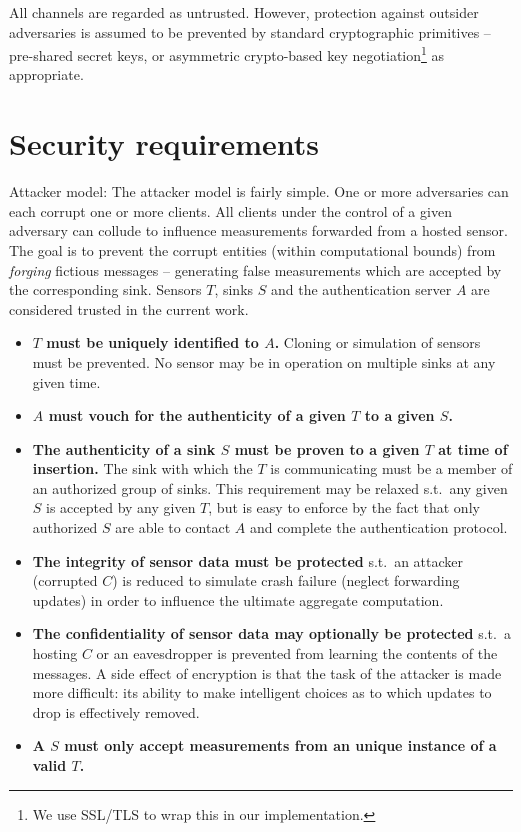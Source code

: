 \documentclass[10pt,a4paper]{article}
\begin{document}
All channels are regarded as untrusted. However, protection against outsider adversaries is assumed to be prevented by standard cryptographic primitives -- pre-shared secret keys, or asymmetric crypto-based key negotiation\footnote{We use SSL/TLS to wrap this in our implementation.} as appropriate.


\section{Security requirements}

Attacker model: The attacker model is fairly simple. One or more adversaries can each corrupt one or more clients. All clients under the control of a given adversary can collude to influence measurements forwarded from a hosted sensor. The goal is to prevent the corrupt entities (within computational bounds) from \textit{forging} fictious messages -- generating false measurements which are accepted by the corresponding sink.
Sensors $T$, sinks $S$ and the authentication server $A$ are considered trusted in the current work.

\begin{itemize}
\item \textbf{$T$ must be uniquely identified to $A$.} Cloning or simulation of sensors must be prevented. No sensor may be in operation on multiple sinks at any given time.
\item \textbf{$A$ must vouch for the authenticity of a given $T$ to a given $S$.} 
\item \textbf{The authenticity of a sink $S$ must be proven to a given $T$ at time of insertion.} The sink with which the $T$ is communicating must be a member of an authorized group of sinks. This requirement may be relaxed s.t.\ any given $S$ is accepted by any given $T$, but is easy to enforce by the fact that only authorized $S$ are able to contact $A$ and complete the authentication protocol.
\item \textbf{The integrity of sensor data must be protected} s.t.\ an attacker (corrupted $C$) is reduced to simulate crash failure (neglect forwarding updates) in order to influence the ultimate aggregate computation.
\item \textbf{The confidentiality of sensor data may optionally be protected} s.t.\ a hosting $C$ or an eavesdropper is prevented from learning the contents of the messages. A side effect of encryption is that the task of the attacker is made more difficult: its ability to make intelligent choices as to which updates to drop is effectively removed.
\item \textbf{A $S$ must only accept measurements from an unique instance of a valid $T$.}
\end{itemize}
\end{document}
